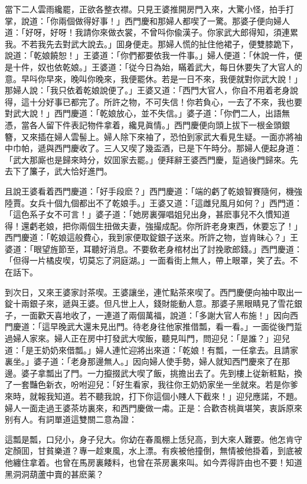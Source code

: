 當下二人雲雨纔罷，正欲各整衣襟。只見王婆推開房門入來，大驚小怪，拍手打掌，說道：「你兩個做得好事！」西門慶和那婦人都喫了一驚。那婆子便向婦人道：「好呀，好呀！我請你來做衣裳，不曾呌你偸漢子。你家武大郎得知，須連累我。不若我先去對武大說去。」囬身便走。那婦人慌的扯住他裙子，便雙膝跪下，說道：「乾娘饒恕！」王婆道：「你們都要依我一件事。」婦人便道：「休說一件，便是十件，奴也依乾娘。」王婆道：「従今日為始，瞞着武大，每日休要失了大官人的意。早呌你早來，晚叫你晚來，我便罷休。若是一日不來，我便就對你武大說！」那婦人說：「我只依着乾娘說便了。」王婆又道：「西門大官人，你自不用着老身說得，這十分好事已都完了。所許之物，不可失信！你若負心，一去了不來，我也要對武大說！」西門慶道：「乾娘放心，並不失信。」婆子道：「你們二人，出語無憑，當各人留下件表記物件拿着，纔見眞情。」西門慶便向頭上拔下一根金頭銀簪，又來插在婦人雲髻上。婦人除下來袖了，恐怕到家武大看見生疑。一面亦將袖中巾帕，遞與西門慶收了。三人又喫了幾盃酒，已是下午時分。那婦人便起身道：「武大那廝也是歸來時分，奴囬家去罷。」便拜辭王婆西門慶，踅過後門歸來。先去下了簾子，武大恰好進門。

且說王婆看着西門慶道：「好手段麽？」西門慶道：「端的虧了乾娘智賽隨何，機強陸賈。女兵十個九個都出不了乾娘手。」王婆又道：「這雌兒風月如何？」西門道：「這色系子女不可言！」婆子道：「她房裏彈唱姐兒出身，甚麽事兒不久慣知道得！還虧老娘，把你兩個生扭做夫妻，強撮成配。你所許老身東西，休要忘了！」西門慶道：「乾娘這般費心，我到家便取錠銀子送來。所許之物，豈肯昧心？」王婆道：「眼望旌節至，耳聽好消息。不要敎老身棺材出了討挽歌郎錢。」西門慶道：「但得一片橘皮喫，切莫忘了洞庭湖。」一面看街上無人，帶上眼罩，笑了去。不在話下。

到次日，又來王婆家討茶喫。王婆讓坐，連忙點茶來喫了。西門慶便向袖中取出一錠十兩銀子來，遞與王婆。但凡世上人，錢財能動人意。那婆子黑眼睛見了雪花銀子，一面歡天喜地收了，一連道了兩個萬福，說道：「多謝大官人布施！」因向西門慶道：「這早晚武大還未見出門。待老身往他家推借瓢，看一看。」一面從後門踅過婦人家來。婦人正在房中打發武大喫飯，聽見叫門，問迎兒：「是誰？」迎兒道：「是王奶奶來借瓢。」婦人連忙迎將出來道：「乾娘！有瓢，一任拿去。且請家裏坐。」婆子道：「老身那邊無人。」因向婦人使手勢，婦人就知西門慶來了在那邊。婆子拿瓢出了門。一力攛掇武大喫了飯，挑擔出去了。先到樓上従新粧點，換了一套豔色新衣，吩咐迎兒：「好生看家，我往你王奶奶家坐一坐就來。若是你爹來時，就報我知道。若不聽我說，打下你這個小賤人下截來！」迎兒應諾，不題。婦人一面走過王婆茶坊裏來，和西門慶做一䖏。正是：合歡杏桃眞堪笑，衷訴原來别有人。有詞單道這雙關二意為證：

\begin{myquote}
這瓢是瓢，口兒小，身子兒大。你幼在春風棚上恁兒高，到大來人難要。他怎肯守定顏囬，甘貧樂道？專一趁東風，水上漂。有疾被他撞倒，無情被他掛着，到底被他纏住拿着。也曾在馬房裏餧料，也曾在茶房裏來叫。如今弄得許由也不要！知道黑洞洞葫蘆中賣的甚麽薬？
\end{myquote}

